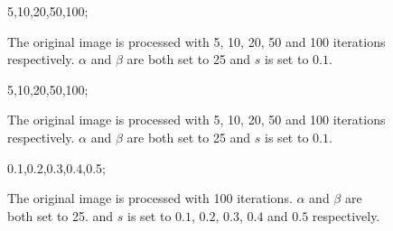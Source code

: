 \begin{figure}
	\centering
	5,10,20,50,100;
	\caption{The original image is processed
	with 5, 10, 20, 50 and 100 iterations respectively.
	$\alpha$ and $\beta$ are both set to 25
	and $s$ is set to $0.1$.}
	\label{fig:woman}
\end{figure}

\begin{figure}
	\centering
	5,10,20,50,100;
	\caption{The original image is processed
	with 5, 10, 20, 50 and 100 iterations respectively.
	$\alpha$ and $\beta$ are both set to 25
	and $s$ is set to $0.1$.}
	\label{fig:three_women}
\end{figure}

\begin{figure}
	\centering
	0.1,0.2,0.3,0.4,0.5;
	\caption{The original image is processed
	with 100 iterations.
	$\alpha$ and $\beta$ are both set to 25.
	and $s$ is set to $0.1$, $0.2$, $0.3$, $0.4$ and $0.5$ respectively.}
	\label{fig:parrots_s_variation}
\end{figure}


